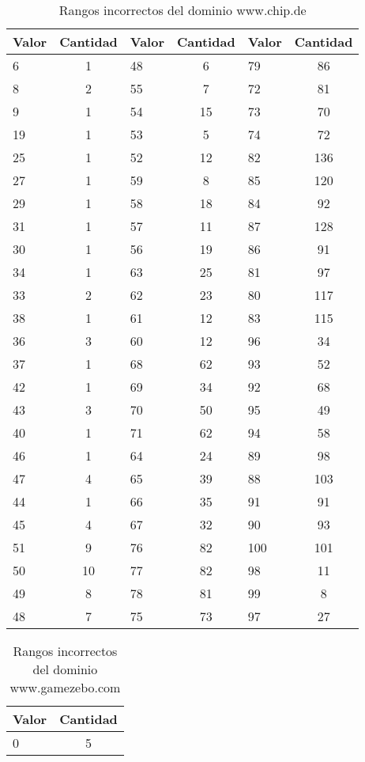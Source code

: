 \begin{table}[h]
\begin{tabular}{| l | c || l | c || l | c |}\hline
 Valor & Cantidad & Valor & Cantidad & Valor & Cantidad\\\hline
 6 & 1 & 48 & 6 & 79 & 86\\
 8 & 2 & 55 & 7 & 72 & 81\\
 9 & 1 & 54 & 15 & 73 & 70\\
 19 & 1 & 53 & 5 & 74 & 72\\
 25 & 1 & 52 & 12 & 82 & 136\\
 27 & 1 & 59 & 8 & 85 & 120\\
 29 & 1 & 58 & 18 & 84 & 92\\
 31 & 1 & 57 & 11 & 87 & 128\\
 30 & 1 & 56 & 19 & 86 & 91\\
 34 & 1 & 63 & 25 & 81 & 97\\
 33 & 2 & 62 & 23 & 80 & 117\\
 38 & 1 & 61 & 12 & 83 & 115\\
 36 & 3 & 60 & 12 & 96 & 34\\
 37 & 1 & 68 & 62 & 93 & 52\\
 42 & 1 & 69 & 34 & 92 & 68\\
 43 & 3 & 70 & 50 & 95 & 49\\
 40 & 1 & 71 & 62 & 94 & 58\\
 46 & 1 & 64 & 24 & 89 & 98\\
 47 & 4 & 65 & 39 & 88 & 103\\
 44 & 1 & 66 & 35 & 91 & 91\\
 45 & 4 & 67 & 32 & 90 & 93\\
 51 & 9 & 76 & 82 & 100 & 101\\
 50 & 10 & 77 & 82 & 98 & 11\\
 49 & 8 & 78 & 81 & 99 & 8\\
 48 & 7 & 75 & 73 & 97 & 27 \\\hline
\end{tabular}
\caption{Rangos incorrectos del dominio www.chip.de}
\label{table:Chip}
\end{table}
 
\begin{table}[h]
\begin{tabular}{| l | c |}\hline
 Valor & Cantidad\\\hline
 0 & 5\\\hline
\end{tabular}
\caption{Rangos incorrectos del dominio www.gamezebo.com}
\label{table:Gamezbo}
\end{table}

